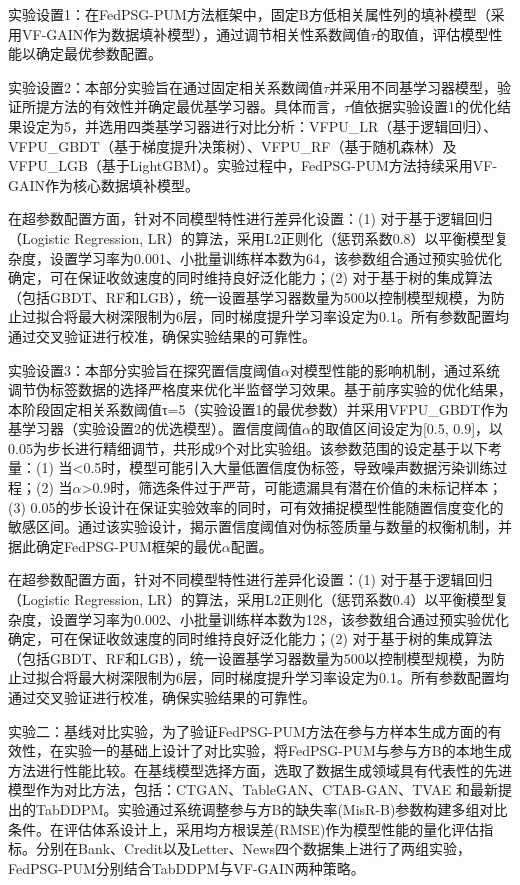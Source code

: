 实验设置1：在FedPSG-PUM方法框架中，固定B方低相关属性列的填补模型（采用VF-GAIN作为数据填补模型），通过调节相关性系数阈值$\tau$的取值，评估模型性能以确定最优参数配置。

实验设置2：本部分实验旨在通过固定相关系数阈值$\tau$并采用不同基学习器模型，验证所提方法的有效性并确定最优基学习器。具体而言，$\tau$值依据实验设置1的优化结果设定为5，并选用四类基学习器进行对比分析：VFPU\_LR（基于逻辑回归）、VFPU\_GBDT（基于梯度提升决策树）、VFPU\_RF（基于随机森林）及VFPU\_LGB（基于LightGBM）。实验过程中，FedPSG-PUM方法持续采用VF-GAIN作为核心数据填补模型。

在超参数配置方面，针对不同模型特性进行差异化设置：(1) 对于基于逻辑回归（Logistic Regression, LR）的算法，采用L2正则化（惩罚系数0.8）以平衡模型复杂度，设置学习率为0.001、小批量训练样本数为64，该参数组合通过预实验优化确定，可在保证收敛速度的同时维持良好泛化能力；(2) 对于基于树的集成算法（包括GBDT、RF和LGB），统一设置基学习器数量为500以控制模型规模，为防止过拟合将最大树深限制为6层，同时梯度提升学习率设定为0.1。所有参数配置均通过交叉验证进行校准，确保实验结果的可靠性。

实验设置3：本部分实验旨在探究置信度阈值$\alpha$对模型性能的影响机制，通过系统调节伪标签数据的选择严格度来优化半监督学习效果。基于前序实验的优化结果，本阶段固定相关系数阈值τ=5（实验设置1的最优参数）并采用VFPU\_GBDT作为基学习器（实验设置2的优选模型）。置信度阈值$\alpha$的取值区间设定为[0.5, 0.9]，以0.05为步长进行精细调节，共形成9个对比实验组。该参数范围的设定基于以下考量：(1) 当<0.5时，模型可能引入大量低置信度伪标签，导致噪声数据污染训练过程；(2) 当$\alpha$>0.9时，筛选条件过于严苛，可能遗漏具有潜在价值的未标记样本；(3) 0.05的步长设计在保证实验效率的同时，可有效捕捉模型性能随置信度变化的敏感区间。通过该实验设计，揭示置信度阈值对伪标签质量与数量的权衡机制，并据此确定FedPSG-PUM框架的最优$\alpha$配置。

在超参数配置方面，针对不同模型特性进行差异化设置：(1) 对于基于逻辑回归（Logistic Regression, LR）的算法，采用L2正则化（惩罚系数0.4）以平衡模型复杂度，设置学习率为0.002、小批量训练样本数为128，该参数组合通过预实验优化确定，可在保证收敛速度的同时维持良好泛化能力；(2) 对于基于树的集成算法（包括GBDT、RF和LGB），统一设置基学习器数量为500以控制模型规模，为防止过拟合将最大树深限制为6层，同时梯度提升学习率设定为0.1。所有参数配置均通过交叉验证进行校准，确保实验结果的可靠性。

实验二：基线对比实验，为了验证FedPSG-PUM方法在参与方样本生成方面的有效性，在实验一的基础上设计了对比实验，将FedPSG-PUM与参与方B的本地生成方法进行性能比较。在基线模型选择方面，选取了数据生成领域具有代表性的先进模型作为对比方法，包括：CTGAN、TableGAN、CTAB-GAN、TVAE 和最新提出的TabDDPM。实验通过系统调整参与方B的缺失率(MisR-B)参数构建多组对比条件。在评估体系设计上，采用均方根误差(RMSE)作为模型性能的量化评估指标。分别在Bank、Credit以及Letter、News四个数据集上进行了两组实验，FedPSG-PUM分别结合TabDDPM与VF-GAIN两种策略。

